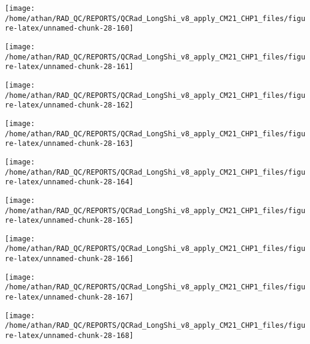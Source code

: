 \documentclass[
  10pt,
  a4paper,oneside]{article}
\begin{document}
\begin{center}\texttt{[image: /home/athan/RAD\_QC/REPORTS/QCRad\_LongShi\_v8\_apply\_CM21\_CHP1\_files/figure-latex/unnamed-chunk-28-160]} \end{center}

\begin{center}\texttt{[image: /home/athan/RAD\_QC/REPORTS/QCRad\_LongShi\_v8\_apply\_CM21\_CHP1\_files/figure-latex/unnamed-chunk-28-161]} \end{center}

\begin{center}\texttt{[image: /home/athan/RAD\_QC/REPORTS/QCRad\_LongShi\_v8\_apply\_CM21\_CHP1\_files/figure-latex/unnamed-chunk-28-162]} \end{center}

\begin{center}\texttt{[image: /home/athan/RAD\_QC/REPORTS/QCRad\_LongShi\_v8\_apply\_CM21\_CHP1\_files/figure-latex/unnamed-chunk-28-163]} \end{center}

\begin{center}\texttt{[image: /home/athan/RAD\_QC/REPORTS/QCRad\_LongShi\_v8\_apply\_CM21\_CHP1\_files/figure-latex/unnamed-chunk-28-164]} \end{center}

\begin{center}\texttt{[image: /home/athan/RAD\_QC/REPORTS/QCRad\_LongShi\_v8\_apply\_CM21\_CHP1\_files/figure-latex/unnamed-chunk-28-165]} \end{center}

\begin{center}\texttt{[image: /home/athan/RAD\_QC/REPORTS/QCRad\_LongShi\_v8\_apply\_CM21\_CHP1\_files/figure-latex/unnamed-chunk-28-166]} \end{center}

\begin{center}\texttt{[image: /home/athan/RAD\_QC/REPORTS/QCRad\_LongShi\_v8\_apply\_CM21\_CHP1\_files/figure-latex/unnamed-chunk-28-167]} \end{center}

\begin{center}\texttt{[image: /home/athan/RAD\_QC/REPORTS/QCRad\_LongShi\_v8\_apply\_CM21\_CHP1\_files/figure-latex/unnamed-chunk-28-168]} \end{center}
\end{document}
